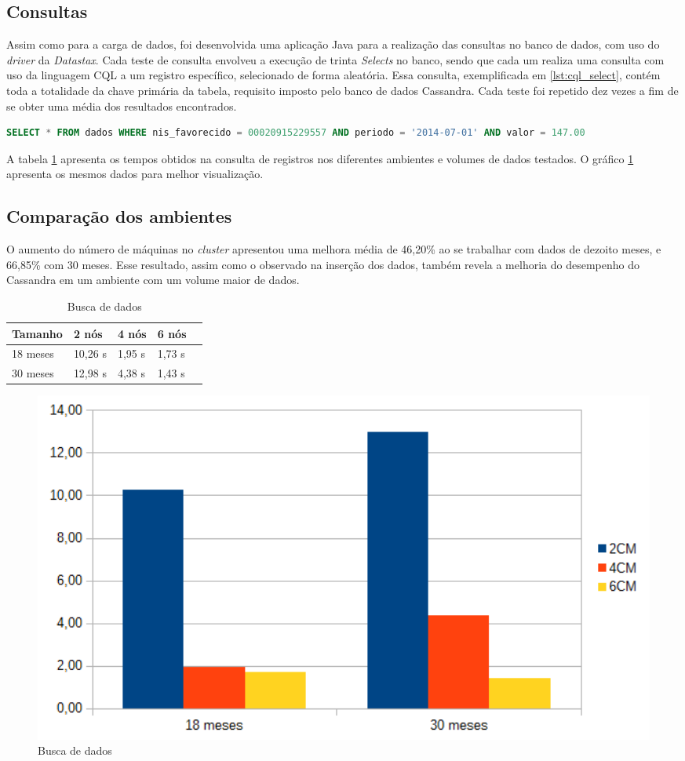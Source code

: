 \subsection{Consultas}
Assim como para a carga de dados, foi desenvolvida uma aplicação Java para a realização das consultas no banco de dados, com uso do \emph{driver} da \emph{Datastax}. Cada teste de consulta envolveu a execução de trinta \emph{Selects} no banco, sendo que cada um realiza uma consulta com uso da linguagem CQL a um registro específico, selecionado de forma aleatória. Essa consulta, exemplificada em \ref{lst:cql_select}, contém toda a totalidade da chave primária da tabela, requisito imposto pelo banco de dados Cassandra. Cada teste foi repetido dez vezes a fim de se obter uma média dos resultados encontrados.

\begin{lstlisting}[caption={Consulta CQL},label={lst:cql_select},language=SQL]
SELECT * FROM dados WHERE nis_favorecido = 00020915229557 AND periodo = '2014-07-01' AND valor = 147.00 
\end{lstlisting}

A tabela \ref{tab:select_busca} apresenta os tempos obtidos na consulta de registros nos diferentes ambientes e volumes de dados testados. O gráfico \ref{fig:graph_select_busca} apresenta os mesmos dados para melhor visualização.

\subsection{Comparação dos ambientes}
O aumento do número de máquinas no \emph{cluster} apresentou uma melhora média de 46,20\% ao se trabalhar com dados de dezoito meses, e 66,85\% com 30 meses. Esse resultado, assim como o observado na inserção dos dados, também revela a melhoria do desempenho do Cassandra em um ambiente com um volume maior de dados.

\begin{table}[]
	\centering
	\caption{Busca de dados}
	\label{tab:select_busca}
	\begin{tabular}{lllll}
		\textbf{Tamanho} & \textbf{2 nós} & \textbf{4 nós} & \textbf{6 nós} \\ \hline
		18 meses         & 10,26 s        & 1,95 s        & 1,73 s        \\ \hline
		30 meses         & 12,98 s        & 4,38 s        & 1,43 s         \\ \hline
	\end{tabular}
\end{table}

\begin{figure}[!htb]
	\centering
	\includegraphics[width=1\textwidth]{figuras/graph_select_buscas.png}
	\caption{Busca de dados}
	\label{fig:graph_select_busca}
\end{figure}
